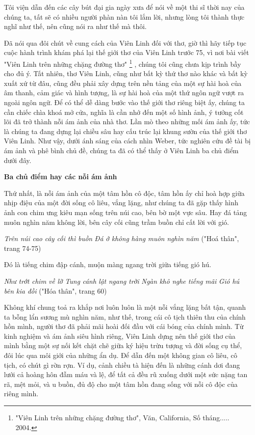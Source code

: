 \documentclass[../main.tex]{subfiles}
\begin{document}
\begin{multicols}{2}
Tôi viện dẫn đến các cây bút đại gia ngày xưa để nói về một thi sĩ thời nay của chúng ta, tất sẽ có nhiều người phàn nàn tôi lắm lời, nhưng lòng tôi thành thực nghĩ như thế, nên cũng nói ra như thế mà thôi. 
 
Đã nói qua đôi chút về cung cách của Viên Linh đối với thơ, giờ thì hãy tiếp tục cuộc hành trình khám phá lại thế giới thơ của Viên Linh trước 75, vì nơi bài viết "Viên Linh trên những chặng đường thơ" \footnote{
"Viên Linh trên những chặng đường thơ", Văn, California, Số tháng..... 2004.} , chúng tôi cũng chưa kịp trình bầy cho đủ ý. Tất nhiên, thơ Viên Linh, cũng như bất kỳ thứ thơ nào khác và bất kỳ xuất xứ từ đâu, cũng đều phải xây dựng trên nền tảng của một sự hài hoà của âm thanh, cảm giác và hình tượng, là sự hài hoà của một thứ ngôn ngữ vượt ra ngoài ngôn ngữ. Để có thể dễ dàng bước vào thế giới thơ riêng biệt ấy, chúng ta cần chiếc chìa khoá mở cửa, nghĩa là cần nhớ đến một số hình ảnh, ý tưởng cốt lõi đã trở thành nỗi ám ảnh của nhà thơ. Lần mò theo những mối ám ảnh ấy, tức là chúng ta đang dựng lại chiều sâu hay cấu trúc lại khung sườn của thế giới thơ Viên Linh. Như vậy, dưới ánh sáng của cách nhìn Weber, tức nghiên cứu đề tài bị ám ảnh và phê bình chủ đề, chúng ta đã có thể thấy ở Viên Linh ba chủ điểm dưới đây. 
 
 
\textbf{Ba chủ điểm hay các nỗi ám ảnh } 
 
Thứ nhất, là nỗi ám ảnh của một tâm hồn cô độc, tâm hồn ấy chỉ hoà hợp giữa nhịp điệu của một đời sống cô liêu, vắng lặng, như chúng ta đã gặp thấy hình ảnh con chim ưng kiêu mạn sống trên núi cao, bên bờ một vực sâu. Hay đá tảng muôn nghìn năm không lời, bên cây cối cũng trầm buồn chỉ cất lời với gió. 
 
\textit{Trên núi cao cây cối thì buồn} 
\textit{Đá ở không hàng muôn nghìn năm} 
("Hoá thân", trang 74-75) 
 
Đó là tiếng chim đập cánh, muộn màng ngang trời giữa tiếng gió hú. 
 
\textit{Như trớt chim về lỡ} 
\textit{Tung cánh lật ngang trời} 
\textit{Ngàn khô nghe tiếng mãi} 
\textit{Gió hú bên kia đồi} 
("Hóa thân", trang 60) 
 
Không khí chung toả ra khắp nơi luôn luôn là một nỗi vắng lặng bất tận, quanh ta bỗng lẩn sương mù nghìn năm, như thế, trong cái cô tịch thiên thu của chính hồn mình, người thơ đã phải mãi hoài đối đầu với cái bóng của chính mình. Từ kinh nghiệm và ám ảnh siêu hình riêng, Viên Linh dựng nên thế giới thơ của mình bằng một sự nối kết chặt chẽ giữa ký hiệu trừu tượng và đời sống cụ thể, đôi lúc qua môi giới của những ẩn dụ. Để dẫn đến một không gian cô liêu, cô tịch, có chút gì rờn rợn. Ví dụ, cảnh chiều tà hiện đến là những cánh dơi đang lưới cả hoàng hôn đẫm máu và lệ, để tất cả đều rũ xuống dưới một sức nặng tan rã, mệt mỏi, và u buồn, đủ độ cho một tâm hồn đang sống với nỗi cô độc của riêng mình. 
 

\end{multicols}
\end{document}
